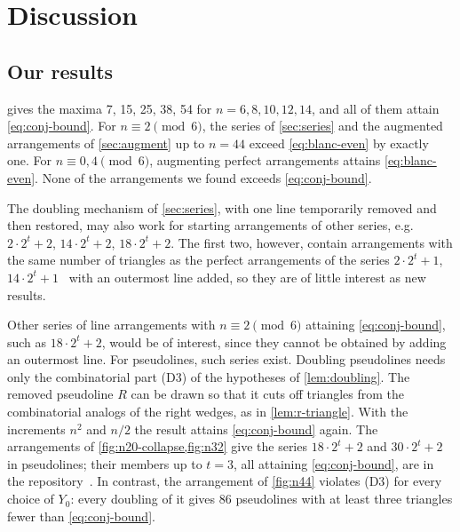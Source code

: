 \section{Discussion}\label{sec:discussion}

\subsection{Our results}

 gives the maxima 7, 15, 25, 38, 54 for $n=6,8,10,12,14$, and all of them attain \eqref{eq:conj-bound}. For $n\equiv2\pmod6$, the series of \cref{sec:series} and the augmented arrangements of \cref{sec:augment} up to $n=44$ exceed \eqref{eq:blanc-even} by exactly one. For $n\equiv0,4\pmod6$, augmenting perfect arrangements attains \eqref{eq:blanc-even}. None of the arrangements we found exceeds \eqref{eq:conj-bound}.

The doubling mechanism of \cref{sec:series}, with one line temporarily removed and then restored, may also work for starting arrangements of other series, e.g.\ $2\cdot2^t+2$, $14\cdot2^t+2$, $18\cdot2^t+2$. The first two, however, contain arrangements with the same number of triangles as the perfect arrangements of the series $2\cdot2^t+1$, $14\cdot2^t+1$~\cite{bbl} with an outermost line added, so they are of little interest as new results.

Other series of line arrangements with $n\equiv2\pmod6$ attaining \eqref{eq:conj-bound}, such as $18\cdot2^t+2$, would be of interest, since they cannot be obtained by adding an outermost line. For pseudolines, such series exist.
Doubling pseudolines needs only the combinatorial part (D3) of the hypotheses of \cref{lem:doubling}.
The removed pseudoline $R$ can be drawn so that it cuts off triangles from the combinatorial analogs of the right wedges, as in \cref{lem:r-triangle}.
With the increments $n^2$ and $n/2$ the result attains \eqref{eq:conj-bound} again.
The arrangements of \cref{fig:n20-collapse,fig:n32} give the series $18\cdot2^t+2$ and $30\cdot2^t+2$ in pseudolines; their members up to $t=3$, all attaining \eqref{eq:conj-bound}, are in the repository~\cite{nonsimple-arrangements}. In contrast, the arrangement of \cref{fig:n44} violates (D3) for every choice of $Y_0$: every doubling of it gives 86 pseudolines with at least three triangles fewer than \eqref{eq:conj-bound}.

